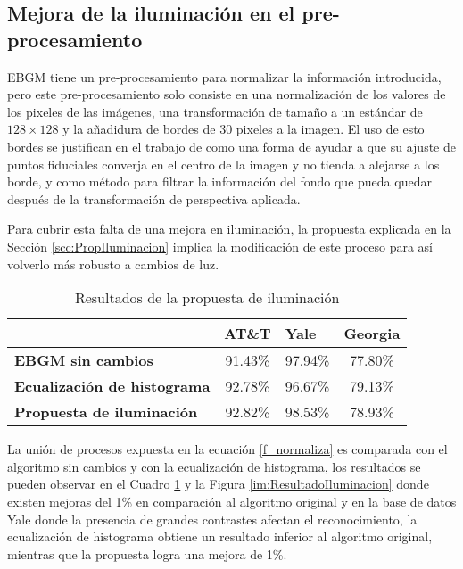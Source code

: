 \subsection{Mejora de la iluminación en el pre-procesamiento} 
\ac{EBGM} tiene un pre-procesamiento para normalizar la información introducida, pero este pre-procesamiento solo consiste en una normalización de los valores de los pixeles de las imágenes, una transformación de tamaño a un estándar de $128 \times 128$ y la añadidura de bordes de 30 pixeles a la imagen. 
El uso de esto bordes se justifican en el trabajo de \cite{bolme2003elastic} como una forma de ayudar a que su ajuste de puntos fiduciales converja en el centro de la imagen y no tienda a alejarse a los borde, y como método para filtrar la información del fondo que pueda quedar después de la transformación de perspectiva aplicada.

Para cubrir esta falta de una mejora en iluminación, la propuesta explicada en la Sección \ref{scc:PropIluminacion} implica la modificación de este proceso para así volverlo más robusto a cambios de luz.

\begin{table}[h]
\centering
\caption{Resultados de la propuesta de iluminación}
\label{ta:ResultadosIluminacion}
\begin{tabular}{|l|c|c|c|}
\hline
\textbf{}                           & \multicolumn{1}{l|}{\textbf{AT\&T}} & \multicolumn{1}{l|}{\textbf{Yale}} & \multicolumn{1}{l|}{\textbf{Georgia}} \\ \hline
\textbf{\ac{EBGM} sin cambios}                & 91.43\%                             & 97.94\%                            & 77.80\%                               \\ \hline
\textbf{Ecualización de histograma} & 92.78\%                             & 96.67\%                            & 79.13\%                               \\ \hline
\textbf{Propuesta de iluminación}   & 92.82\%                             & 98.53\%                            & 78.93\%                               \\ \hline
\end{tabular}
\end{table}

La unión de procesos expuesta en la ecuación \ref{f_normaliza} es comparada con el algoritmo sin cambios y con la ecualización de histograma, los resultados se pueden observar en el Cuadro \ref{ta:ResultadosIluminacion} y la Figura \ref{im:ResultadoIluminacion} donde existen mejoras del 1\% en comparación al algoritmo original y en la base de datos Yale donde la presencia de grandes contrastes afectan el reconocimiento, la ecualización de histograma obtiene un resultado inferior al algoritmo original, mientras que la propuesta logra una mejora de 1\%.

